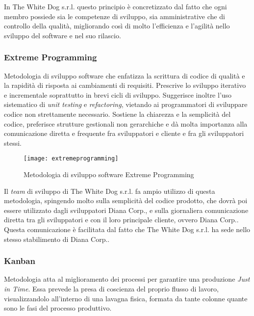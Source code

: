 In The White Dog s.r.l. questo principio è concretizzato dal fatto che ogni membro possiede sia le competenze di sviluppo, sia amministrative che di controllo della qualità, migliorando così di molto l'efficienza e l'agilità nello sviluppo del software e nel suo rilascio.

\subsubsection{Extreme Programming}

Metodologia di sviluppo software che enfatizza la scrittura di codice di qualità e la rapidità di risposta ai cambiamenti di requisiti. Prescrive lo sviluppo iterativo e incrementale soprattutto in brevi cicli di sviluppo. Suggerisce inoltre l'uso sistematico di \textit{unit testing} e \textit{refactoring}, vietando ai programmatori di sviluppare codice non strettamente necessario. Sostiene la chiarezza e la semplicità del codice, preferisce strutture gestionali non gerarchiche e dà molta importanza  alla comunicazione diretta e frequente fra sviluppatori e cliente e fra gli sviluppatori stessi. 

\label{Extreme Programming}
\begin{figure}[ht]
	\begin{center}
		\texttt{[image: extremeprogramming]}
		\caption{Metodologia di sviluppo software Extreme Programming}
	\end{center}
\end{figure}
\FloatBarrier

Il \textit{team} di sviluppo di The White Dog s.r.l. fa ampio utilizzo di questa metodologia, spingendo molto sulla semplicità del codice prodotto, che dovrà poi essere utilizzato dagli sviluppatori Diana Corp., e sulla giornaliera comunicazione diretta tra gli sviluppatori e con il loro principale cliente, ovvero Diana Corp.. Questa comunicazione è facilitata dal fatto che The White Dog s.r.l. ha sede nello stesso stabilimento di Diana Corp..

\subsubsection{Kanban}

Metodologia atta al miglioramento dei processi per garantire una produzione \textit{Just in Time}. Essa prevede la presa di coscienza del proprio flusso di lavoro, visualizzandolo all'interno di una lavagna fisica, formata da tante colonne quante sono le fasi del processo produttivo.

